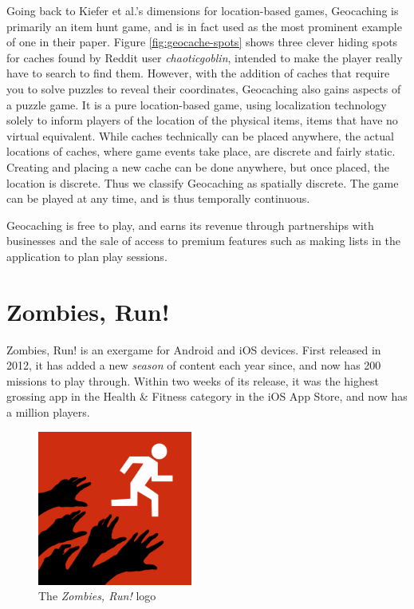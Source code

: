 Going back to Kiefer et al.'s \cite{kiefer2006systematically} dimensions for location-based games, Geocaching is primarily an item hunt game, and is in fact used as the most prominent example of one in their paper. Figure \ref{fig:geocache-spots} shows three clever hiding spots for caches found by Reddit user \emph{chaoticgoblin}, intended to make the player really have to search to find them. However, with the addition of caches that require you to solve puzzles to reveal their coordinates, Geocaching also gains aspects of a puzzle game. It is a pure location-based game, using localization technology solely to inform players of the location of the physical items, items that have no virtual equivalent. While caches technically can be placed anywhere, the actual locations of caches, where game events take place, are discrete and fairly static. Creating and placing a new cache can be done anywhere, but once placed, the location is discrete. Thus we classify Geocaching as spatially discrete. The game can be played at any time, and is thus temporally continuous.

Geocaching is free to play, and earns its revenue through partnerships with businesses and the sale of access to premium features such as making lists in the application to plan play sessions.

\section{Zombies, Run!}

Zombies, Run! is an exergame for Android and iOS devices. First released in 2012, it has added a new \emph{season} of content each year since, and now has 200 missions to play through. Within two weeks of its release, it was the highest grossing app in the Health \& Fitness category in the iOS App Store, and now has a million players.

\begin{figure}[h]
	\centering
	\includegraphics[height=2in]{Figures/zombies-run-logo}
	\caption{The \emph{Zombies, Run!} logo}
\end{figure}

